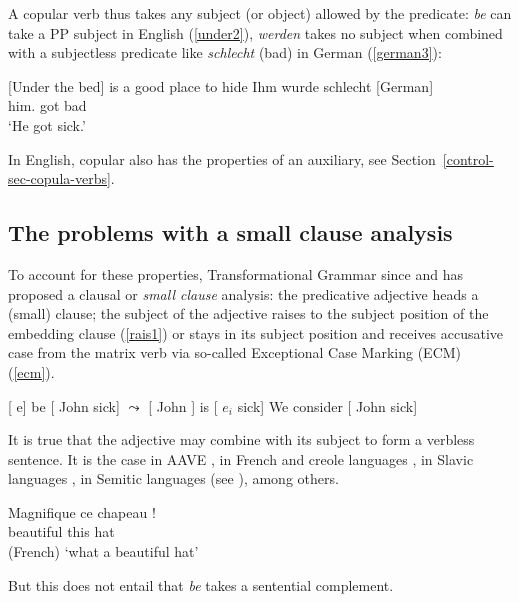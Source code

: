 \documentclass[output=paper
	        ,collection
	        ,collectionchapter
 	        ,biblatex
                ,babelshorthands
                ,newtxmath
                ,draftmode
                ,colorlinks, citecolor=brown
]{langscibook}
\begin{document}
A copular verb thus takes any subject (or object) allowed by the predicate: \emph{be} can take a PP subject in English (\ref{under2}), \emph{werden} takes no subject when combined with a subjectless predicate like \emph{schlecht} (bad) in German (\ref{german3}):

\eal
\ex{}[Under the bed] is a good place to hide \label{under2}
\ex 
\gll Ihm wurde schlecht [German] \citep[]{Mueller2002b}\label{german3}\\
     him.\DAT{} got bad\\
\glt `He got sick.'
\zl

 In English, copular  also has the properties of an auxiliary, see Section~\ref{control-sec-copula-verbs}.

\subsection{The problems with a small clause analysis}

To account for these properties, Transformational Grammar since \citet{Stowell1983} and
\citet{Chomsky1986} has proposed a clausal or \emph{small clause} analysis: the predicative
adjective heads a (small) clause; the subject of the adjective raises to the subject position of the
embedding clause (\ref{rais1}) or stays in its subject position and receives accusative case from
the matrix verb via so-called Exceptional Case Marking (ECM) (\ref{ecm}).


\begin{exe}
\ex  {}[ e] be [ John sick] $\leadsto$  [ John ] is  [ $e_{i}$ sick] \label{rais1}
\ex   We consider [ John sick] \label{ecm}
\end{exe}

It is true that the adjective may combine with its subject to form a verbless sentence. It is the
case in AAVE \citep{Bender2001a}, in French \citet{Laurens2008} and creole languages
\citet{HenriandAbeille2007}, in Slavic languages \citep{Zec87a-u}, in Semitic languages (see
\citealp{Alqurashi:Borsley:14}), among others. 

\begin{exe}
\ex \gll Magnifique ce chapeau !\\
beautiful this hat\\\hfill{(French)}
\glt `what a beautiful hat'
\end{exe}

But this does not entail that \emph{be} takes a sentential complement. 
\end{document}
